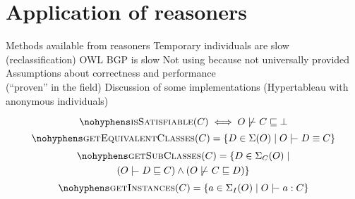 \documentclass[paper.tex]{subfiles}
\begin{document}
\section{Application of reasoners}
\label{sec:reasoners}

\begin{todos}
  \todo Methods available from reasoners
  \todo Temporary individuals are slow (reclassification)
  \todo OWL BGP is slow
  \todo Not using  because not universally provided
  \todo Assumptions about correctness and performance \\(``proven'' in the field)
  \todo Discussion of some implementations (Hypertableau with anonymous individuals)
\end{todos}

\todo[in ontology $O$]

\[ \textproc{isSatisfiable}(C) \iff O \not\sementails C \sqsubseteq \bot \]
\[ \textproc{getEquivalentClasses}(C) = \{ D \in \signature(O) \mid O \sementails D \equiv C \} \]
\begin{multline*}
  \textproc{getSubClasses}(C) =
  \{
    D \in \signature_C(O)
  \mid \\
    (O \sementails D \sqsubseteq C) \land (O \not\sementails C \sqsubseteq D)
  \}
\end{multline*}
\[ \textproc{getInstances}(C) = \{ a \in \signature_I(O) \mid O \sementails a : C \} \]

\end{document}
